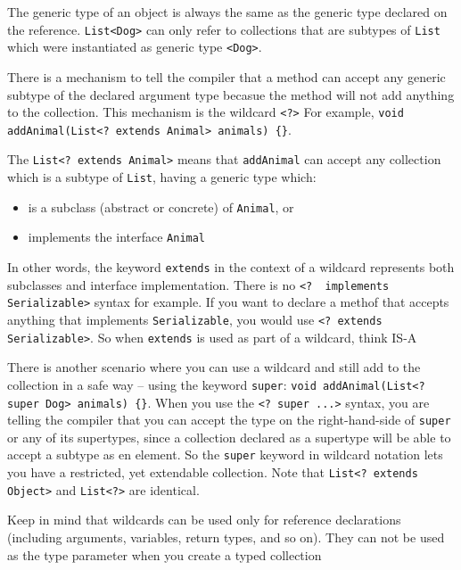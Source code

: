 The generic type of an object is always the same as the generic type declared 
on the reference. \verb#List<Dog># can only refer to collections that are 
subtypes of \verb#List# which were instantiated as generic type \verb#<Dog>#.

There is a mechanism to tell the compiler that a method can accept any generic 
subtype of the declared argument type becasue the method will not add anything 
to the collection. This mechanism is the wildcard \verb#<?># For example, 
\verb#void addAnimal(List<? extends Animal> animals) {}#. 

The \verb#List<? extends Animal># means that \verb#addAnimal# can accept any 
collection which is a subtype of \verb#List#, having a generic type which:
\begin{itemize}
    \item is a subclass (abstract or concrete) of \verb#Animal#, or
    \item implements the interface \verb#Animal#
\end{itemize}
In other words, the keyword \verb#extends# in the context of a wildcard 
represents both subclasses and interface implementation. There is no
\verb#<?  implements Serializable># syntax for example. If you want to declare 
a methof that accepts anything that implements \verb#Serializable#, you would 
use \verb#<? extends Serializable>#. So when \verb#extends# is used as part of 
a wildcard, think IS-A

There is another scenario where you can use a wildcard and still add to the 
collection in a safe way -- using the keyword \verb#super#:
\verb#void addAnimal(List<? super Dog> animals) {}#. When you use the
\verb#<? super ...># syntax, you are telling the compiler that you can accept 
the type on the right-hand-side of \verb#super# or any of its supertypes, since 
a collection declared as a supertype will be able to accept a subtype as en 
element. So the \verb#super# keyword in wildcard notation lets you have a 
restricted, yet extendable collection. Note that \verb#List<? extends Object># 
and \verb#List<?># are identical.

Keep in mind that wildcards can be used only for reference declarations 
(including arguments, variables, return types, and so on). They can not be used 
as the type parameter when you create a typed collection

